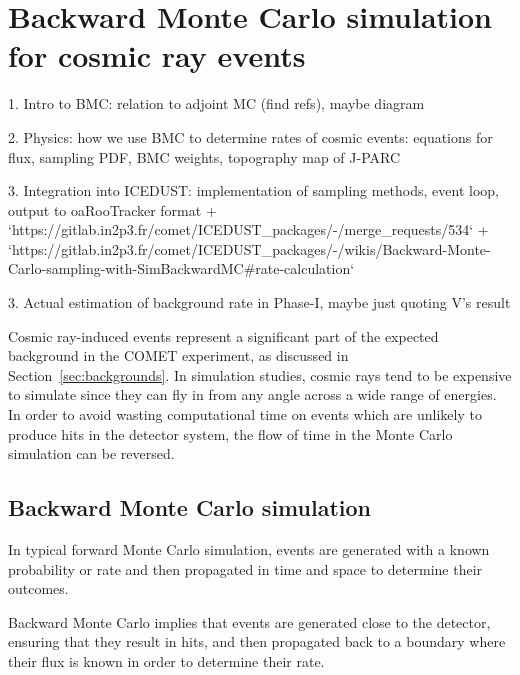 \chapter{Backward Monte Carlo simulation for cosmic ray events}\label{ch:cosmics}

\begin{markdown}

1. Intro to BMC: relation to adjoint MC (find refs), maybe diagram

2. Physics: how we use BMC to determine rates of cosmic events: equations for
flux, sampling PDF, BMC weights, topography map of J-PARC

3. Integration into ICEDUST: implementation of sampling methods, event loop, output to
oaRooTracker format
+ `https://gitlab.in2p3.fr/comet/ICEDUST_packages/-/merge_requests/534`
+ `https://gitlab.in2p3.fr/comet/ICEDUST_packages/-/wikis/Backward-Monte-Carlo-sampling-with-SimBackwardMC#rate-calculation`

3. Actual estimation of background rate in Phase-I, maybe just quoting V's
result


\end{markdown}

Cosmic ray-induced events represent a significant part of the expected
background in the COMET experiment, as discussed in
Section~\ref{sec:backgrounds}. In simulation studies, cosmic rays tend to be
expensive to simulate since they can fly in from any angle across a wide range
of energies. In order to avoid wasting computational time on events which are
unlikely to produce hits in the detector system, the flow of time in the Monte
Carlo simulation can be reversed. 

\section{Backward Monte Carlo simulation}
In typical forward Monte Carlo simulation, events are generated with a known
probability or rate and then propagated in time and space to determine their
outcomes. 

Backward Monte Carlo implies that events are generated close to the detector,
ensuring that they result in hits, and then propagated back to a boundary
where their flux is known in order to determine their rate.